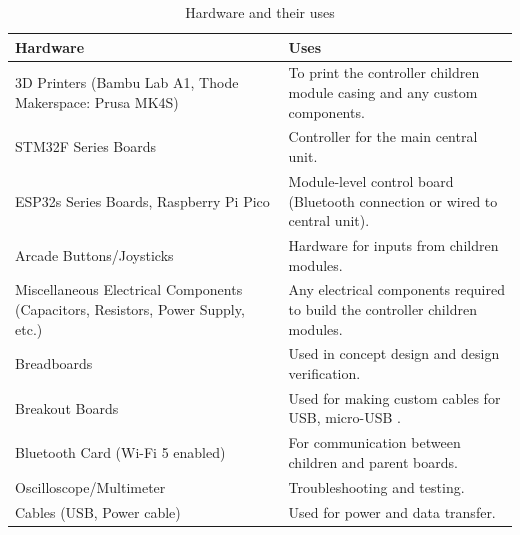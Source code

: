 \documentclass[a4]{article}
\begin{document}
\begin{table}[h!]
	\renewcommand{\arraystretch}{1.2} %
	\centering
	\begin{tabularx}{\linewidth}{|Y|Y|}
		\hline
		\textcolor{McMasterMaroon}{\textbf{Hardware}}                                   & \textcolor{McMasterMaroon}{\textbf{Uses}}                                    \\
		\hline
		3D Printers (Bambu Lab A1, Thode Makerspace: Prusa MK4S)                        & To print the controller children module casing and any custom components.    \\
		\hline
		STM32F Series Boards                                                            & Controller for the main central unit.                                        \\
		\hline
		ESP32s Series Boards, Raspberry Pi Pico                                         & Module-level control board (Bluetooth connection or wired to central unit).  \\
		\hline
		Arcade Buttons/Joysticks                                                        & Hardware for inputs from children modules.                                   \\
		\hline
		Miscellaneous Electrical Components (Capacitors, Resistors, Power Supply, etc.) & Any electrical components required to build the controller children modules. \\
		\hline
		Breadboards                                                                     & Used in concept design and design verification.                              \\
		\hline
		Breakout Boards                                                                 & Used for making custom cables for USB, micro-USB .                           \\
		\hline
		Bluetooth Card (Wi-Fi 5 enabled)                                                & For communication between children and parent boards.                        \\
		\hline
		Oscilloscope/Multimeter                                                         & Troubleshooting and testing.                                                 \\
		\hline
		Cables (USB, Power cable)                                                       & Used for power and data transfer.                                            \\
		\hline
	\end{tabularx}
	\caption{Hardware and their uses}
\end{table}
\end{document}
